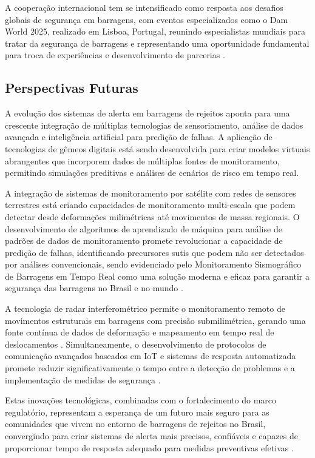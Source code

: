 A cooperação internacional tem se intensificado como resposta aos desafios globais de segurança em barragens, com eventos especializados como o Dam World 2025, realizado em Lisboa, Portugal, reunindo especialistas mundiais para tratar da segurança de barragens e representando uma oportunidade fundamental para troca de experiências e desenvolvimento de parcerias \cite{mdr2025defesa}.

\subsection{Perspectivas Futuras}

A evolução dos sistemas de alerta em barragens de rejeitos aponta para uma crescente integração de múltiplas tecnologias de sensoriamento, análise de dados avançada e inteligência artificial para predição de falhas. A aplicação de tecnologias de gêmeos digitais está sendo desenvolvida para criar modelos virtuais abrangentes que incorporem dados de múltiplas fontes de monitoramento, permitindo simulações preditivas e análises de cenários de risco em tempo real.

A integração de sistemas de monitoramento por satélite com redes de sensores terrestres está criando capacidades de monitoramento multi-escala que podem detectar desde deformações milimétricas até movimentos de massa regionais. O desenvolvimento de algoritmos de aprendizado de máquina para análise de padrões de dados de monitoramento promete revolucionar a capacidade de predição de falhas, identificando precursores sutis que podem não ser detectados por análises convencionais, sendo evidenciado pelo Monitoramento Sismográfico de Barragens em Tempo Real como uma solução moderna e eficaz para garantir a segurança das barragens no Brasil e no mundo \cite{sequencia2024tempo}.

A tecnologia de radar interferométrico permite o monitoramento remoto de movimentos estruturais em barragens com precisão submilimétrica, gerando uma fonte contínua de dados de deformação e mapeamento em tempo real de deslocamentos \cite{hexagon2024monitoramento}. Simultaneamente, o desenvolvimento de protocolos de comunicação avançados baseados em IoT e sistemas de resposta automatizada promete reduzir significativamente o tempo entre a detecção de problemas e a implementação de medidas de segurança \cite{ufpr2021simepar}.

Estas inovações tecnológicas, combinadas com o fortalecimento do marco regulatório, representam a esperança de um futuro mais seguro para as comunidades que vivem no entorno de barragens de rejeitos no Brasil, convergindo para criar sistemas de alerta mais precisos, confiáveis e capazes de proporcionar tempo de resposta adequado para medidas preventivas efetivas \cite{radaz2024revolucionando}.